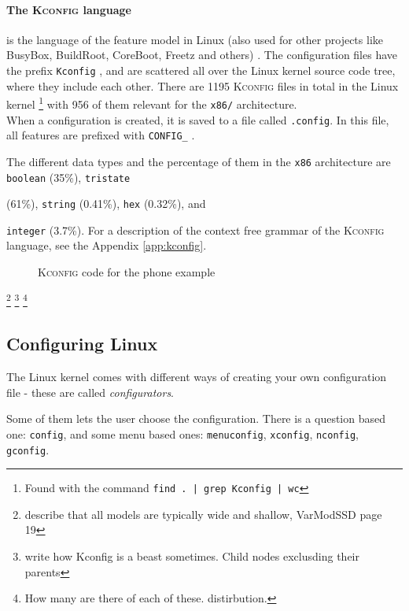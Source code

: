 \documentclass[a4paper,11pt]{report}
\newcommand{\textcode}[1]{
    \fboxsep=1pt
    \texttt{\colorbox{gray!20}{#1}}
}
\newcommand{\figa}{
    \begin{figure}[!htpb]
    \centering
}
\newcommand{\figb}[2]{
    \caption{#1}
    \label{#2}
    \end{figure}
}
\begin{document}
            \paragraph{The \textsc{Kconfig} language} 
is the language of the feature model in Linux (also used for other projects 
like BusyBox, BuildRoot, CoreBoot, Freetz and others)
    \cite[p. 4]{VarModSSD}
.
The configuration files have the prefix \textcode{Kconfig}, and are 
scattered all over the Linux kernel source code tree, where they include each 
other. There are 1195 \textsc{Kconfig} files in total in the Linux kernel
    \footnote{Found with the command \textcode{find . | grep Kconfig | wc}}
with 956 of them relevant for the \texttt{x86/} architecture.
\\

When a configuration is created, it is saved to a file called \texttt{.config}.
In this file, all features are prefixed with \textcode{CONFIG\_}.

The different data types and the percentage of them in the \texttt{x86} 
architecture are \textcode{boolean} (35\%), \textcode{tristate} 
(61\%), \textcode{string} (0.41\%), \textcode{hex} (0.32\%), and 
\textcode{integer} (3.7\%). For a description of the context free grammar of 
the \textsc{Kconfig} language, see the Appendix \ref{app:kconfig}.
\\

\figa
    
\figb{\textsc{Kconfig} code for the phone example}{kconfigphone}


        \footnote{describe that all models are typically wide and shallow, 
        VarModSSD page 19}
        \footnote{write how Kconfig is a beast sometimes. Child nodes exclusding 
        their parents}
        \footnote{How many are there of each of these. distirbution.}

        \subsection{Configuring Linux}

The Linux kernel comes with different ways of creating your own configuration 
file - these are called \emph{configurators}. 

Some of them lets the user choose the configuration. There is a question based 
one: \texttt{config}, and some menu based ones: \texttt{menuconfig}, 
\texttt{xconfig}, \texttt{nconfig}, \texttt{gconfig}.
\\
\end{document}
